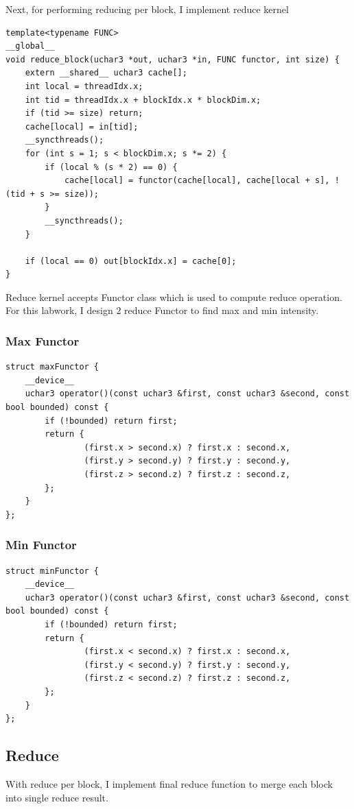 \documentclass{article}
\begin{document}
Next, for performing reducing per block, I implement reduce kernel
\begin{Verbatim}[fontsize=\small]
template<typename FUNC>
__global__
void reduce_block(uchar3 *out, uchar3 *in, FUNC functor, int size) {
    extern __shared__ uchar3 cache[];
    int local = threadIdx.x;
    int tid = threadIdx.x + blockIdx.x * blockDim.x;
    if (tid >= size) return;
    cache[local] = in[tid];
    __syncthreads();
    for (int s = 1; s < blockDim.x; s *= 2) {
        if (local % (s * 2) == 0) {
            cache[local] = functor(cache[local], cache[local + s], !(tid + s >= size));
        }
        __syncthreads();
    }

    if (local == 0) out[blockIdx.x] = cache[0];
}
\end{Verbatim}

Reduce kernel accepts Functor class which is used to compute reduce operation. For this labwork,
I design 2 reduce Functor to find max and min intensity.

\subsubsection{Max Functor}
\begin{Verbatim}[fontsize=\small]
struct maxFunctor {
    __device__
    uchar3 operator()(const uchar3 &first, const uchar3 &second, const bool bounded) const {
        if (!bounded) return first;
        return {
                (first.x > second.x) ? first.x : second.x,
                (first.y > second.y) ? first.y : second.y,
                (first.z > second.z) ? first.z : second.z,
        };
    }
};
\end{Verbatim}

\subsubsection{Min Functor}
\begin{Verbatim}[fontsize=\small]
struct minFunctor {
    __device__
    uchar3 operator()(const uchar3 &first, const uchar3 &second, const bool bounded) const {
        if (!bounded) return first;
        return {
                (first.x < second.x) ? first.x : second.x,
                (first.y < second.y) ? first.y : second.y,
                (first.z < second.z) ? first.z : second.z,
        };
    }
};
\end{Verbatim}

\subsection{Reduce}
With reduce per block, I implement final reduce function to merge each block into single reduce
result.
\end{document}
